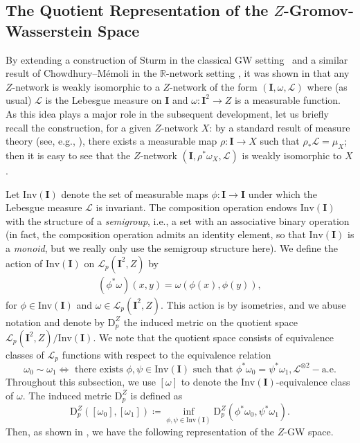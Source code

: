 \documentclass{article}
\theoremstyle{definition}
\newcommand{\Lp}{\mathcal{L}_p}
\newcommand{\dpz}{\mathrm{D}^Z_p}
\newcommand{\dz}[1]{\mathrm{D}^Z_{#1}}
\begin{document}
%
%
%
%
%
%
%

%
%
%
%
%
%
%
%
%
%
%


\subsection{The Quotient Representation of the \texorpdfstring{$Z$}{Z}-Gromov-Wasserstein Space}\label{sec:quotient_map} 
By extending a construction of Sturm in the classical GW setting~\cite[Theorem 5.10]{sturm2020} and a similar result of Chowdhury--M\'emoli in the $\mathbb{R}$-network setting \cite[Section 2.5.1]{chowdhury2019gromovwassersteindistancenetworksstable}, it was shown in \cite[Proposition 32]{bauer2025zgromovwassersteindistance} that any $Z$-network is weakly isomorphic to a $Z$-network of the form $(\mathbf{I}, \omega, \mathscr{L})$ where (as usual) $\mathscr{L}$ is the Lebesgue measure on $\mathbf{I}$ and $\omega: \mathbf{I}^2 \to Z$ is a measurable function. As this idea plays a major role in the subsequent development, let us briefly recall the construction, for a given $Z$-network $X$: by a standard result of measure theory (see, e.g., \cite[Lemma 4.2]{shioya2016metric}), there exists a measurable map $\rho:\mathbf{I} \to X$ such that $\rho_\ast \mathscr{L} = \mu_X$; then it is easy to see that the $Z$-network $(\mathbf{I},\rho^\ast \omega_X, \mathscr{L})$ is weakly isomorphic to $X$. 

%
%
%
%
%
%
%
%
%
%
%
%




Let $\mathrm{Inv}(\mathbf{I})$ denote the set of measurable maps $\phi:\mathbf{I} \to \mathbf{I}$ under which the Lebesgue measure $\mathscr{L}$ is invariant. The composition operation endows $\mathrm{Inv}(\mathbf{I})$ with the structure of a \emph{semigroup}, i.e., a set with an associative binary operation (in fact, the composition operation admits an identity element, so that $\mathrm{Inv}(\mathbf{I})$ is a  \emph{monoid}, but we really only use the semigroup structure here).  We define the action of $\mathrm{Inv}(\mathbf{I})$ on $\Lp(\mathbf{I}^2, Z)$ by
\begin{align}
    (\phi^* \omega)(x, y) = \omega(\phi(x), \phi(y)),
\end{align}
for $\phi \in \mathrm{Inv}(\mathbf{I})$ and $\omega \in \Lp(\mathbf{I}^2, Z)$. This action is by isometries, and we abuse notation and denote by $\dpz$ the induced metric on the quotient space $\Lp(\mathbf{I}^2,Z)/\mathrm{Inv}(\mathbf{I})$. We note that the quotient space consists of equivalence classes of $\Lp$ functions with respect to the equivalence relation 
\[
\omega_0\sim \omega_1\Leftrightarrow \mbox{ there exists } \phi,\psi \in \mathrm{Inv}(\mathbf{I}) \mbox{ such that } \phi^*\omega_0=\psi^*\omega_1, \mathscr{L}^{\otimes 2}-\textrm{a.e.}
\]
Throughout this subsection, we use $[\omega]$ to denote the $\mathrm{Inv}(\mathbf{I})$-equivalence class of $\omega$. The induced metric $\dpz$ is defined as 
\[
\dpz([\omega_0],[\omega_1]) \coloneqq \inf_{\phi,\psi\in \mathrm{Inv}(\mathbf{I})}\dz{p}(\phi^*\omega_0,\psi^*\omega_1).
\]
Then, as shown in \cite{bauer2025zgromovwassersteindistance}, we have the following representation of the $Z$-GW space.
\end{document}
